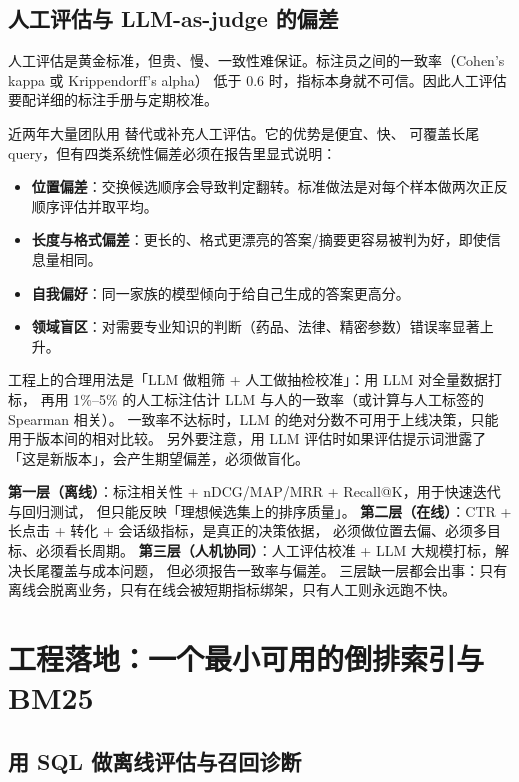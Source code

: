 \subsection{人工评估与 LLM-as-judge 的偏差}

人工评估是黄金标准，但贵、慢、一致性难保证。标注员之间的一致率（Cohen's kappa 或 Krippendorff's alpha）
低于 0.6 时，指标本身就不可信。因此人工评估要配详细的标注手册与定期校准。

近两年大量团队用  替代或补充人工评估。它的优势是便宜、快、
可覆盖长尾 query，但有四类系统性偏差必须在报告里显式说明：

\begin{itemize}
  \item \textbf{位置偏差}：交换候选顺序会导致判定翻转。标准做法是对每个样本做两次正反顺序评估并取平均。
  \item \textbf{长度与格式偏差}：更长的、格式更漂亮的答案/摘要更容易被判为好，即使信息量相同。
  \item \textbf{自我偏好}：同一家族的模型倾向于给自己生成的答案更高分。
  \item \textbf{领域盲区}：对需要专业知识的判断（药品、法律、精密参数）错误率显著上升。
\end{itemize}

工程上的合理用法是「LLM 做粗筛 + 人工做抽检校准」：用 LLM 对全量数据打标，
再用 1\%--5\% 的人工标注估计 LLM 与人的一致率（或计算与人工标签的 Spearman 相关）。
一致率不达标时，LLM 的绝对分数不可用于上线决策，只能用于版本间的相对比较。
另外要注意，用 LLM 评估时如果评估提示词泄露了「这是新版本」，会产生期望偏差，必须做盲化。

\begin{keypoint}[评价体系的三层结构]
\textbf{第一层（离线）}：标注相关性 + nDCG/MAP/MRR + Recall@K，用于快速迭代与回归测试，
但只能反映「理想候选集上的排序质量」。
\textbf{第二层（在线）}：CTR + 长点击 + 转化 + 会话级指标，是真正的决策依据，
必须做位置去偏、必须多目标、必须看长周期。
\textbf{第三层（人机协同）}：人工评估校准 + LLM 大规模打标，解决长尾覆盖与成本问题，
但必须报告一致率与偏差。
三层缺一层都会出事：只有离线会脱离业务，只有在线会被短期指标绑架，只有人工则永远跑不快。
\end{keypoint}

\section{工程落地：一个最小可用的倒排索引与 BM25}

\subsection{用 SQL 做离线评估与召回诊断}

